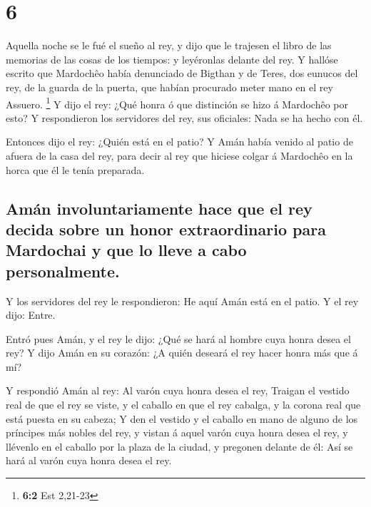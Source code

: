 \hypertarget{section-5}{%
\section{6}\label{section-5}}

 Aquella noche se le fué el sueño al rey, y dijo que le
trajesen el libro de las memorias de las cosas de los tiempos: y
leyéronlas delante del rey.  Y hallóse escrito que Mardochêo
había denunciado de Bigthan y de Teres, dos eunucos del rey, de la
guarda de la puerta, que habían procurado meter mano en el rey Assuero.
\footnote{\textbf{6:2} Est 2,21-23}  Y dijo el rey: ¿Qué
honra ó que distinción se hizo á Mardochêo por esto? Y respondieron los
servidores del rey, sus oficiales: Nada se ha hecho con él.

 Entonces dijo el rey: ¿Quién está en el patio? Y Amán había
venido al patio de afuera de la casa del rey, para decir al rey que
hiciese colgar á Mardochêo en la horca que él le tenía preparada.

\hypertarget{amuxe1n-involuntariamente-hace-que-el-rey-decida-sobre-un-honor-extraordinario-para-mardochai-y-que-lo-lleve-a-cabo-personalmente.}{%
\subsection{Amán involuntariamente hace que el rey decida sobre un honor
extraordinario para Mardochai y que lo lleve a cabo
personalmente.}\label{amuxe1n-involuntariamente-hace-que-el-rey-decida-sobre-un-honor-extraordinario-para-mardochai-y-que-lo-lleve-a-cabo-personalmente.}}

 Y los servidores del rey le respondieron: He aquí Amán está
en el patio. Y el rey dijo: Entre.

 Entró pues Amán, y el rey le dijo: ¿Qué se hará al hombre
cuya honra desea el rey? Y dijo Amán en su corazón: ¿A quién deseará el
rey hacer honra más que á mí?

 Y respondió Amán al rey: Al varón cuya honra desea el rey,
 Traigan el vestido real de que el rey se viste, y el
caballo en que el rey cabalga, y la corona real que está puesta en su
cabeza;  Y den el vestido y el caballo en mano de alguno de
los príncipes más nobles del rey, y vistan á aquel varón cuya honra
desea el rey, y llévenlo en el caballo por la plaza de la ciudad, y
pregonen delante de él: Así se hará al varón cuya honra desea el rey.

